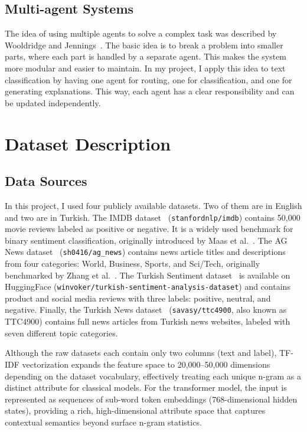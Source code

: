 \documentclass[conference]{IEEEtran}
\begin{document}
\subsection{Multi-agent Systems}

The idea of using multiple agents to solve a complex task was described by Wooldridge and
Jennings~\cite{b_wj}. The basic idea is to break a problem into smaller parts, where each
part is handled by a separate agent. This makes the system more modular and easier to
maintain. In my project, I apply this idea to text classification by having one agent for
routing, one for classification, and one for generating explanations. This way, each agent
has a clear responsibility and can be updated independently.

\section{Dataset Description}
\label{sec:dataset}

\subsection{Data Sources}

In this project, I used four publicly available datasets. Two of them are in English and
two are in Turkish. The IMDB dataset~\cite{b_imdb} (\texttt{stanfordnlp/imdb}) contains
50,000 movie reviews labeled as positive or negative. It is a widely used benchmark for
binary sentiment classification, originally introduced by Maas et al.~\cite{b8}.
The AG News dataset~\cite{b_agnews} (\texttt{sh0416/ag\_news}) contains news article
titles and descriptions from four categories: World, Business, Sports, and Sci/Tech,
originally benchmarked by Zhang et al.~\cite{b9}. The Turkish Sentiment dataset~\cite{b_trsentiment}
is available on HuggingFace (\texttt{winvoker/turkish-sentiment-analysis-dataset}) and
contains product and social media reviews with three labels: positive, neutral, and negative.
Finally, the Turkish News dataset~\cite{b_trnews} (\texttt{savasy/ttc4900}, also known as
TTC4900) contains full news articles from Turkish news websites, labeled with seven different
topic categories.

Although the raw datasets each contain only two columns (text and label), TF-IDF
vectorization expands the feature space to 20{,}000--50{,}000 dimensions depending on the
dataset vocabulary, effectively treating each unique n-gram as a distinct attribute for
classical models. For the transformer model, the input is represented as sequences of
sub-word token embeddings (768-dimensional hidden states), providing a rich, high-dimensional
attribute space that captures contextual semantics beyond surface n-gram statistics.
\end{document}
